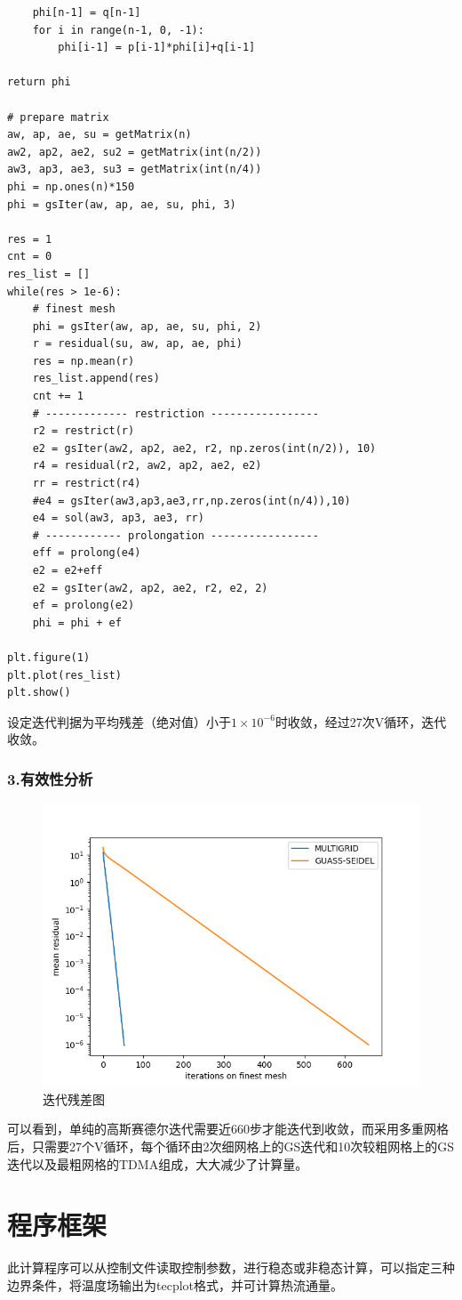 \documentclass[10pt]{scrartcl}
\begin{document}
\begin{lstlisting}
	phi[n-1] = q[n-1]
	for i in range(n-1, 0, -1):
		phi[i-1] = p[i-1]*phi[i]+q[i-1]

return phi

# prepare matrix
aw, ap, ae, su = getMatrix(n)
aw2, ap2, ae2, su2 = getMatrix(int(n/2))
aw3, ap3, ae3, su3 = getMatrix(int(n/4))
phi = np.ones(n)*150
phi = gsIter(aw, ap, ae, su, phi, 3)

res = 1
cnt = 0
res_list = []
while(res > 1e-6):
	# finest mesh
	phi = gsIter(aw, ap, ae, su, phi, 2)
	r = residual(su, aw, ap, ae, phi)
	res = np.mean(r)
	res_list.append(res)
	cnt += 1
	# ------------- restriction -----------------
	r2 = restrict(r)
	e2 = gsIter(aw2, ap2, ae2, r2, np.zeros(int(n/2)), 10)
	r4 = residual(r2, aw2, ap2, ae2, e2)
	rr = restrict(r4)
	#e4 = gsIter(aw3,ap3,ae3,rr,np.zeros(int(n/4)),10)
	e4 = sol(aw3, ap3, ae3, rr)
	# ------------ prolongation -----------------
	eff = prolong(e4)
	e2 = e2+eff
	e2 = gsIter(aw2, ap2, ae2, r2, e2, 2)
	ef = prolong(e2)
	phi = phi + ef

plt.figure(1)
plt.plot(res_list)
plt.show()
\end{lstlisting}


设定迭代判据为平均残差（绝对值）小于$1\times 10^{-6}$时收敛，经过27次V循环，迭代收敛。

\subsubsection{3.有效性分析}

\begin{figure}[H]
	\centering
	\includegraphics[width=0.6\linewidth]{result}
	\caption{迭代残差图}
	\label{fig:result}
\end{figure}


可以看到，单纯的高斯赛德尔迭代需要近660步才能迭代到收敛，而采用多重网格后，只需要27个V循环，每个循环由2次细网格上的GS迭代和10次较粗网格上的GS迭代以及最粗网格的TDMA组成，大大减少了计算量。
\section{程序框架}
此计算程序可以从控制文件读取控制参数，进行稳态或非稳态计算，可以指定三种边界条件，将温度场输出为tecplot格式，并可计算热流通量。
\end{document}
